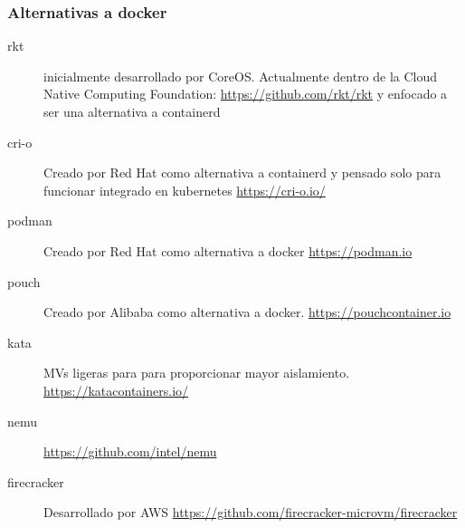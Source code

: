 \documentclass[aspectratio=169]{beamer}
\begin{document}
\begin{frame}
  \frametitle{Alternativas a docker}
  \begin{description}
  \item [rkt] inicialmente desarrollado por CoreOS. Actualmente dentro
    de la Cloud Native Computing Foundation:
    \url{https://github.com/rkt/rkt} y enfocado a ser una alternativa
    a containerd
  \item[cri-o] Creado por Red Hat como alternativa a containerd y pensado solo para funcionar integrado en kubernetes \url{https://cri-o.io/}
  \item[podman] Creado por Red Hat como alternativa a docker
    \url{https://podman.io}
  \item[pouch] Creado por Alibaba como alternativa a
    docker. \url{https://pouchcontainer.io}
  \item[kata] MVs ligeras para para proporcionar mayor aislamiento.
    \url{https://katacontainers.io/}
  \item[nemu] \url{https://github.com/intel/nemu}
  \item[firecracker] Desarrollado por AWS \url{https://github.com/firecracker-microvm/firecracker}
  \end{description}
\end{frame}
\end{document}
